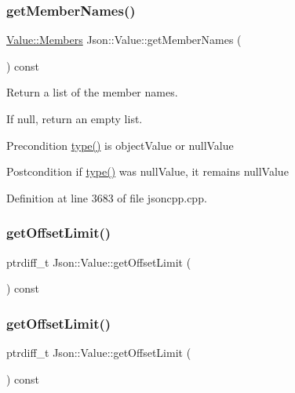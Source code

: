 \subsubsection{\texorpdfstring{get\+Member\+Names()}{getMemberNames()}\hspace{0.1cm}{\footnotesize\ttfamily [2/2]}}
{\footnotesize\ttfamily \hyperlink{class_json_1_1_value_a9ae9069983fc38f1928d76f9c79ac64d}{Value\+::\+Members} Json\+::\+Value\+::get\+Member\+Names (\begin{DoxyParamCaption}{ }\end{DoxyParamCaption}) const}



Return a list of the member names. 

If null, return an empty list. \begin{DoxyPrecond}{Precondition}
\hyperlink{class_json_1_1_value_a8ce61157a011894f0252ceed232312de}{type()} is object\+Value or null\+Value 
\end{DoxyPrecond}
\begin{DoxyPostcond}{Postcondition}
if \hyperlink{class_json_1_1_value_a8ce61157a011894f0252ceed232312de}{type()} was null\+Value, it remains null\+Value 
\end{DoxyPostcond}


Definition at line 3683 of file jsoncpp.\+cpp.

\hypertarget{class_json_1_1_value_a2cdfa01935f87fcace90d450cbd2c0a4}{}\label{class_json_1_1_value_a2cdfa01935f87fcace90d450cbd2c0a4} 
\subsubsection{\texorpdfstring{get\+Offset\+Limit()}{getOffsetLimit()}\hspace{0.1cm}{\footnotesize\ttfamily [1/2]}}
{\footnotesize\ttfamily ptrdiff\+\_\+t Json\+::\+Value\+::get\+Offset\+Limit (\begin{DoxyParamCaption}{ }\end{DoxyParamCaption}) const}

\hypertarget{class_json_1_1_value_a2cdfa01935f87fcace90d450cbd2c0a4}{}\label{class_json_1_1_value_a2cdfa01935f87fcace90d450cbd2c0a4} 
\subsubsection{\texorpdfstring{get\+Offset\+Limit()}{getOffsetLimit()}\hspace{0.1cm}{\footnotesize\ttfamily [2/2]}}
{\footnotesize\ttfamily ptrdiff\+\_\+t Json\+::\+Value\+::get\+Offset\+Limit (\begin{DoxyParamCaption}{ }\end{DoxyParamCaption}) const}



